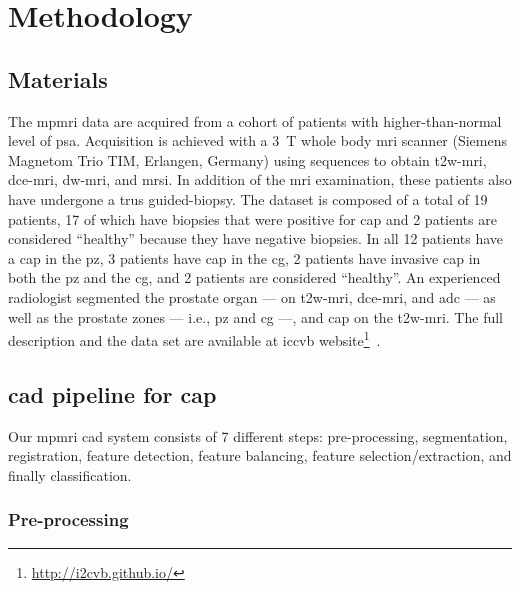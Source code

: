 \section{Methodology}\label{sec:chp6:method}

\subsection{Materials}

The \ac{mpmri} data are acquired from a cohort of patients with
higher-than-normal level of \ac{psa}.
Acquisition is achieved with a \SI{3}{\tesla} whole body
\ac{mri} scanner (Siemens Magnetom Trio TIM, Erlangen, Germany) using
sequences to obtain \ac{t2w}-\ac{mri}, \ac{dce}-\ac{mri},
\ac{dw}-\ac{mri}, and \ac{mrsi}.
In addition of the \ac{mri} examination, these patients also have undergone
a \ac{trus} guided-biopsy.
The dataset is composed of a total of 19 patients, 17 of which
have biopsies that were positive for \ac{cap} and 2 patients are considered
``healthy'' because they have negative biopsies.
In all 12 patients have a \ac{cap} in the \ac{pz}, 3 patients
have \ac{cap} in the \ac{cg}, 2 patients have invasive \ac{cap} in
both the \ac{pz} and the \ac{cg}, and 2 patients are considered
``healthy''.
An experienced radiologist segmented the prostate organ --- on
\ac{t2w}-\ac{mri}, \ac{dce}-\ac{mri}, and \ac{adc} --- as
well as the prostate zones --- i.e., \ac{pz} and \ac{cg} ---, and
\ac{cap} on the \ac{t2w}-\ac{mri}.
The full description and the data set are available at \acs*{iccvb}
website\footnote{\url{http://i2cvb.github.io/}}~\cite{Lemaitre2016thesis}.

\subsection{\acs*{cad} pipeline for \acs*{cap}}

Our \ac{mpmri} \ac{cad} system consists of 7 different steps:
pre-processing, segmentation, registration, feature detection, feature
balancing, feature selection/extraction, and finally classification.

\subsubsection{Pre-processing}\label{subsec:chp6:method:PP}

